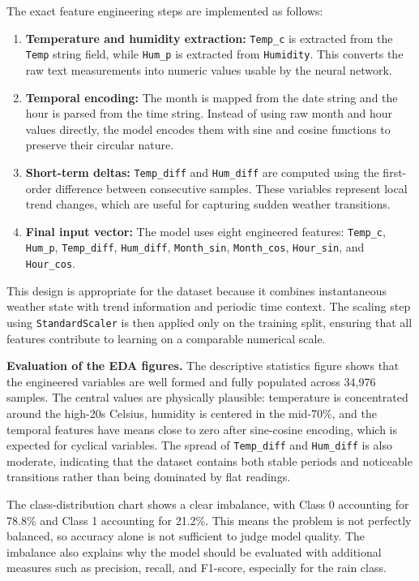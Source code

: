 The exact feature engineering steps are implemented as follows:
\begin{enumerate}
  \item \textbf{Temperature and humidity extraction:} \texttt{Temp\_c} is extracted from the \texttt{Temp} string field, while \texttt{Hum\_p} is extracted from \texttt{Humidity}. This converts the raw text measurements into numeric values usable by the neural network.
  \item \textbf{Temporal encoding:} The month is mapped from the date string and the hour is parsed from the time string. Instead of using raw month and hour values directly, the model encodes them with sine and cosine functions to preserve their circular nature.
  \item \textbf{Short-term deltas:} \texttt{Temp\_diff} and \texttt{Hum\_diff} are computed using the first-order difference between consecutive samples. These variables represent local trend changes, which are useful for capturing sudden weather transitions.
  \item \textbf{Final input vector:} The model uses eight engineered features: \texttt{Temp\_c}, \texttt{Hum\_p}, \texttt{Temp\_diff}, \texttt{Hum\_diff}, \texttt{Month\_sin}, \texttt{Month\_cos}, \texttt{Hour\_sin}, and \texttt{Hour\_cos}.
\end{enumerate}

This design is appropriate for the dataset because it combines instantaneous weather state with trend information and periodic time context. The scaling step using \texttt{StandardScaler} is then applied only on the training split, ensuring that all features contribute to learning on a comparable numerical scale.

\noindent\textbf{Evaluation of the EDA figures.} The descriptive statistics figure shows that the engineered variables are well formed and fully populated across 34,976 samples. The central values are physically plausible: temperature is concentrated around the high-20s Celsius, humidity is centered in the mid-70\%, and the temporal features have means close to zero after sine-cosine encoding, which is expected for cyclical variables. The spread of \texttt{Temp\_diff} and \texttt{Hum\_diff} is also moderate, indicating that the dataset contains both stable periods and noticeable transitions rather than being dominated by flat readings.

The class-distribution chart shows a clear imbalance, with Class 0 accounting for 78.8\% and Class 1 accounting for 21.2\%. This means the problem is not perfectly balanced, so accuracy alone is not sufficient to judge model quality. The imbalance also explains why the model should be evaluated with additional measures such as precision, recall, and F1-score, especially for the rain class.

